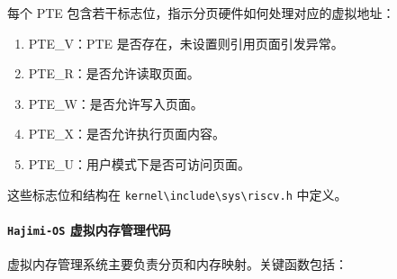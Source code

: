 \documentclass[UTF8]{article}
\begin{document}
每个 PTE 包含若干标志位，指示分页硬件如何处理对应的虚拟地址：
\begin{enumerate}[label=\textbf{\arabic*}., wide, labelwidth=!, labelindent=0pt]
  \item PTE\_V：PTE 是否存在，未设置则引用页面引发异常。
  \item PTE\_R：是否允许读取页面。
  \item PTE\_W：是否允许写入页面。
  \item PTE\_X：是否允许执行页面内容。
  \item PTE\_U：用户模式下是否可访问页面。
\end{enumerate}

这些标志位和结构在 \texttt{kernel\textbackslash include\textbackslash sys\textbackslash riscv.h} 中定义。

\paragraph{\texttt{Hajimi-OS} 虚拟内存管理代码\\}
虚拟内存管理系统主要负责分页和内存映射。关键函数包括：
\end{document}
